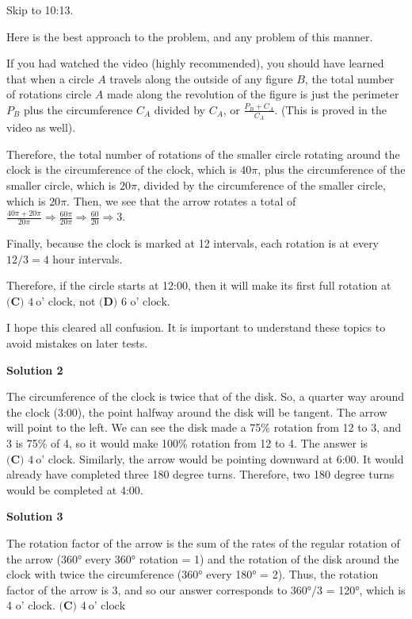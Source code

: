 \begin{enumerate}
 Skip to 10:13.

 Here is the best approach to the problem, and any problem of this manner.

 If you had watched the video (highly recommended), you should have learned that when a circle $A$ travels along the outside of any figure $B$, the total number of rotations circle $A$ made along the revolution of the figure is just the perimeter $P_B$ plus the circumference $C_A$ divided by $C_A$, or $\frac{P_B + C_A}{C_A}$. (This is proved in the video as well).

 Therefore, the total number of rotations of the smaller circle rotating around the clock is the circumference of the clock, which is $40\pi$, plus the circumference of the smaller circle, which is $20\pi$, divided by the circumference of the smaller circle, which is $20\pi$. Then, we see that the arrow rotates a total of $\frac{40\pi + 20\pi}{20\pi} \Rightarrow \frac{60\pi}{20\pi} \Rightarrow \frac{60}{20} \Rightarrow 3$.

 Finally, because the clock is marked at 12 intervals, each rotation is at every $12/3 = 4$ hour intervals.

 Therefore, if the circle starts at 12:00, then it will make its first full rotation at $\boxed{\textbf{(C) }4 \ \text{o' clock}}$, not $\textbf{(D) }\text{6 o' clock}$.

 I hope this cleared all confusion. It is important to understand these topics to avoid mistakes on later tests.

 



\textbf{Solution 2}

The circumference of the clock is twice that of the disk. So, a quarter way around the clock (3:00), the point halfway around the disk will be tangent. The arrow will point to the left. We can see the disk made a 75\% rotation from 12 to 3, and 3 is 75\% of 4, so it would make 100\% rotation from 12 to 4. The answer is $\boxed{\textbf{(C) }4 \ \text{o' clock}}$. Similarly, the arrow would be pointing downward at 6:00. It would already have completed three 180 degree turns. Therefore, two 180 degree turns would be completed at 4:00.

 


 



\textbf{Solution 3}

The rotation factor of the arrow is the sum of the rates of the regular rotation of the arrow (360° every 360° rotation = 1) and the rotation of the disk around the clock with twice the circumference (360° every 180° = 2). Thus, the rotation factor of the arrow is 3, and so our answer corresponds to 360°/3 = 120°, which is 4 o' clock. $\boxed{\textbf{(C) }4 \ \text{o' clock}}$





\end{enumerate}
